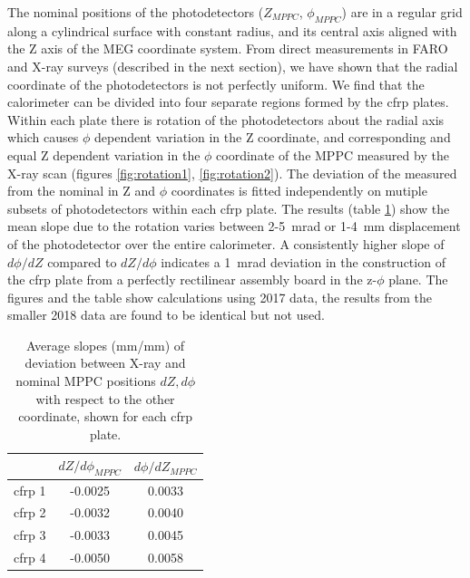 The nominal positions of the photodetectors ($Z_{MPPC}$,
$\phi_{MPPC}$) are in a regular grid along a cylindrical surface with
constant radius, and its central axis aligned with the Z axis of the
MEG coordinate system.  From direct measurements in FARO and X-ray
surveys (described in the next section), we have shown  that the
radial coordinate of the photodetectors is not perfectly uniform.  We
find that the calorimeter can be divided into four separate regions
formed by the cfrp plates. Within each plate there is rotation of the
photodetectors about the radial axis which causes $\phi$ dependent
variation in the Z coordinate, and corresponding and equal Z dependent
variation in the $\phi$ coordinate of the MPPC measured by the X-ray
scan (figures \ref{fig:rotation1}, \ref{fig:rotation2}). The deviation of the measured from
the nominal in Z and $\phi$ coordinates is fitted independently on
mutiple subsets of photodetectors within each cfrp plate. The results
(table \ref{tab:rotation}) show the mean slope due to the rotation
varies between 2-5~mrad  or 1-4~mm displacement of the photodetector
over the entire calorimeter.
A consistently higher slope of  $d\phi/dZ$ compared to $dZ/d\phi$
indicates a 1~mrad deviation in the construction of the cfrp plate
from a perfectly 
rectilinear assembly board in the z-$\phi$ plane.  The figures and the
table show calculations using 2017 data, the results from the smaller
2018 data are found to be identical but not used. 

\begin{table}
\begin{tabular}{ccc}
   & $dZ/d\phi_{MPPC}$ & $d\phi/dZ_{MPPC}$ \\
\hline 
cfrp 1 & -0.0025 & 0.0033 \\
cfrp 2 & -0.0032 & 0.0040 \\
cfrp 3 & -0.0033 & 0.0045 \\
cfrp 4 & -0.0050 & 0.0058 \\
\end{tabular}
\caption{Average slopes (mm/mm) of deviation between X-ray and nominal MPPC positions
$dZ, d\phi$ with respect to the other coordinate, shown for each 
cfrp plate.}
\label{tab:rotation}
\end{table}

